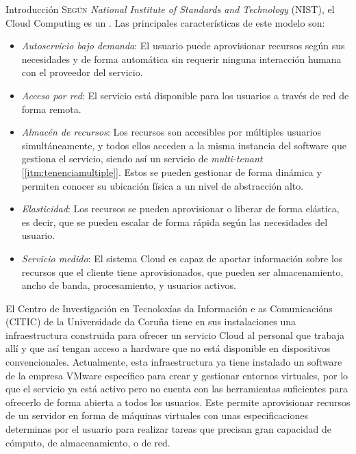\begin{chapter}{Introducción}
\label{chap:introducion}
\lettrine{S}{egún} \textit{National Institute of Standards and Technology} (NIST), el Cloud Computing es un \cite{DefCloudComputing}. Las principales características de este modelo son\label{nist}:
\begin{itemize}
    \item \emph{Autoservicio bajo demanda}: El usuario puede aprovisionar recursos según sus necesidades y de forma automática sin requerir ninguna interacción humana con el proveedor del servicio.
    \item \emph{Acceso por red}: El servicio está disponible para los usuarios a través de red de forma remota.
    \item \emph{Almacén de recursos}: Los recursos son accesibles por múltiples usuarios simultáneamente, y todos ellos acceden a la misma instancia del software que gestiona el servicio, siendo así un servicio de \textit{multi-tenant} [\ref{itm:tenenciamultiple}]. Estos se pueden gestionar de forma dinámica y permiten conocer su ubicación física a un nivel de abstracción alto.
    \item \emph{Elasticidad}: Los recursos se pueden aprovisionar o liberar de forma elástica, es decir, que se pueden escalar de forma rápida según las necesidades del usuario.
    \item \emph{Servicio medido}: El sistema Cloud es capaz de aportar información sobre los recursos que el cliente tiene aprovisionados, que pueden ser almacenamiento, ancho de banda, procesamiento, y usuarios activos.
\end{itemize}
 
 El Centro de Investigación en Tecnoloxías da Información e as Comunicacións (CITIC) de la Universidade da Coruña tiene en sus instalaciones una infraestructura construida para ofrecer un servicio Cloud al personal que trabaja allí y que así tengan acceso a hardware que no está disponible en dispositivos convencionales. Actualmente, esta infraestructura ya tiene instalado un software de la empresa VMware específico para crear y gestionar entornos virtuales, por lo que el servicio ya está activo pero no cuenta con las herramientas suficientes para ofrecerlo de forma abierta a todos los usuarios. Este permite aprovisionar recursos de un servidor en forma de máquinas virtuales con unas especificaciones determinas por el usuario para realizar tareas que precisan gran capacidad de cómputo, de almacenamiento, o de red.
 

\end{chapter}
